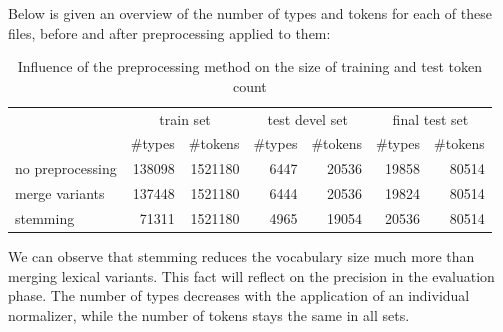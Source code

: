 Below is given an overview of the number of types and tokens for each of these files, before and after 
preprocessing applied to them:

\begin{table}[h!]
\begin{tabular}{ l | r r | r r| r r |}
& \multicolumn{2}{|c}{train set} & \multicolumn{2}{|c}{test devel set} & \multicolumn{2}{|c|}{final test set} \\
   &  \#types & \#tokens  &  \#types & \#tokens  &  \#types & \#tokens \\
  \hline                       
no preprocessing &138098 & 1521180 & 6447 & 20536 & 19858 & 80514 \\ 
 merge variants &137448 & 1521180 & 6444 & 20536 & 19824 & 80514 \\ 
stemming &71311 & 1521180 & 4965 & 19054 & 20536 & 80514 \\ 
\end{tabular}
\caption{Influence of the preprocessing method on the size of training and test token count}
\end{table}
We can observe that stemming reduces the vocabulary size much more than merging 
lexical variants. This fact will reflect on the precision in the evaluation phase. The number of types decreases with the application of an individual normalizer, while the number of tokens stays the same in all sets. 


